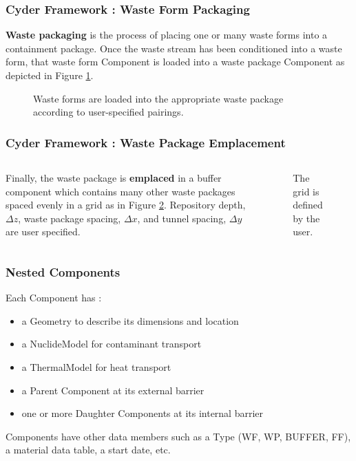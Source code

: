 \begin{frame}[ctb!]
  \frametitle{Cyder Framework : Waste Form Packaging}
  \footnotesize{

    \textbf{Waste packaging} is the process of placing one or many waste forms into a 
containment package. Once the waste stream has been conditioned into a waste 
form, that waste form Component is loaded into a waste package Component as 
depicted in Figure \ref{fig:wf_packaging}.  

\begin{figure}[htbp!]
\begin{center}
\def\svgwidth{.5\textwidth}

\end{center}
\caption{Waste forms are loaded into the appropriate waste package 
according to user-specified pairings.}
\label{fig:wf_packaging}
\end{figure}
}
\end{frame}

\begin{frame}[ctb!]
  \frametitle{Cyder Framework : Waste Package Emplacement}
  \footnotesize{
  
\begin{columns}[c]
  Finally, the waste package is \textbf{emplaced} in a buffer component which 
contains many other waste packages spaced evenly in a grid as in Figure 
\ref{fig:repo_layout}. Repository depth, $\Delta z$, waste package spacing, 
$\Delta x$, and tunnel spacing, $\Delta y$ are user specified.


\begin{figure}[htbp!]
\begin{center}
\def\svgwidth{.5\textwidth}

\end{center}
\caption{ The grid is defined by the user.  }
\label{fig:repo_layout}
\end{figure}
\end{columns}

}
\end{frame}


\begin{frame}
  \frametitle{Nested Components}
  Each Component has : 
  \begin{itemize}
    \item a Geometry to describe its dimensions and location
    \item a NuclideModel for contaminant transport 
    \item a ThermalModel for heat transport
    \item a Parent Component at its external barrier
    \item one or more Daughter Components at its internal barrier
  \end{itemize}

  Components have other data members such as a Type (WF, WP, BUFFER, FF), a 
  material data table, a start date, etc. 
\end{frame}


